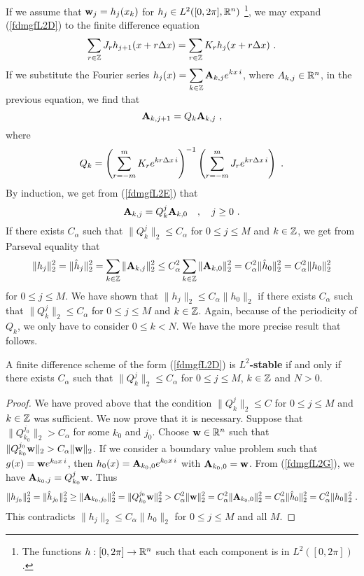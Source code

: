If we assume that $\displaystyle \mathbf{w}_j = h_j(x_k)$ for
$h_j \in L^2([0,2\pi],\mathbb{R}^n)$ \footnote{The functions
$h:[0,2\pi] \to \mathbb{R}^n$ such that each component is in $L^2([0,2\pi])$.},
we may expand (\ref{fdmgfL2D}) to the finite difference equation
\begin{equation}\label{fdmgfL2F}
\sum_{r\in \mathbb{Z}} J_r h_{j+1}(x+r\Delta{x}) =
\sum_{r\in \mathbb{Z}} K_r h_j(x+r\Delta{x}) \ .
\end{equation}
If we substitute the Fourier series
$\displaystyle h_j(x) = \sum_{k\in \mathbb{Z}} \mathbf{A}_{k,j} e^{k x\, i}$,
where $A_{k,j} \in \mathbb{R}^n$, in the previous equation, we find that
\begin{equation}\label{fdmgfL2E}
  \mathbf{A}_{k,j+1} = Q_k \mathbf{A}_{k,j} \ ,
\end{equation}
where
\[
  Q_k = \left( \sum_{r=-m}^m K_r e^{k r \Delta{x}\, i} \right)^{-1}
  \left( \sum_{r=-m}^m J_r  e^{k r \Delta{x}\, i} \right) \ .
\]
By induction, we get from (\ref{fdmgfL2E}) that
\begin{equation}\label{fdmgfL2G}
\mathbf{A}_{k,j} = Q_k^j \mathbf{A}_{k,0} \quad , \quad j \geq 0 \ .
\end{equation}
If there exists $C_\alpha$ such that $\|Q_k^j\|_2 \leq C_\alpha$ for
$0\leq j \leq M$ and $k \in \mathbb{Z}$,  we get from Parseval equality that
\[
  \|h_j\|_2^2 = \|\hat{h}_j \|_2^2
  = \sum_{k\in \mathbb{Z}} \|\mathbf{A}_{k,j}\|_2^2
\leq C_\alpha^2 \sum_{k\in \mathbb{Z}} \|\mathbf{A}_{k,0}\|_2^2
= C_\alpha^2 \|\hat{h}_0 \|_2^2 = C_\alpha^2\|h_0\|_2^2
\]
for $0 \leq j \leq M$.  We have shown that $\|h_j\|_2 \leq C_\alpha \|h_0\|_2$
if there exists $C_\alpha$ such that $\|Q_k^j\|_2 \leq C_\alpha$ for
$0\leq j \leq M$ and $k \in \mathbb{Z}$.   Again, because of the periodicity
of $Q_k$, we only have to consider $0 \leq k <N$.  We have the more
precise result that follows.

\begin{prop}
A finite difference scheme of the form (\ref{fdmgfL2D}) is
{\bfseries $L^2$-stable} if and only if there exists $C_\alpha$ such that
$\|Q_k^j\|_2 \leq C_\alpha$ for $0\leq j \leq M$, $k \in \mathbb{Z}$ and $N>0$.
\label{QkjCstable}
\end{prop}

\begin{proof}
We have proved above that the condition $\|Q_k^j\|_2 \leq C$ for
$0\leq j \leq M$ and $k \in \mathbb{Z}$ was sufficient.   We now prove that
it is necessary.  Suppose that $\|Q_{k_0}^{j_0}\|_2 > C_\alpha$ for
some $k_0$ and $j_0$.  Choose $\mathbf{w} \in \mathbb{R}^n$ such that
$\|Q_{k_0}^{j_0}\mathbf{w}\|_2 > C_\alpha \|\mathbf{w}\|_2$.
If we consider a boundary value problem
such that $g(x) = \mathbf{w} e^{k_0 x\, i}$, then
$\displaystyle h_0(x) = \mathbf{A}_{k_0,0} e^{k_0 x\, i}$ with
$\mathbf{A}_{k_0,0} = \mathbf{w}$.  From (\ref{fdmgfL2G}), we have
$\mathbf{A}_{k_0,j} = Q_{k_0}^j\mathbf{w}$.   Thus
\[
\|h_{j_0}\|_2^2 = \|\hat{h}_{j_0}\|_2^2 \geq \|\mathbf{A}_{k_0,j_0}\|_2^2
= \| Q_{k_0}^{j_0} \mathbf{w} \|_2^2
> C_\alpha^2 \|\mathbf{w}\|_2^2 = C_\alpha^2 \|\mathbf{A}_{k_0,0}\|_2^2
= C_\alpha^2 \|\hat{h}_0\|_2^2 = C_\alpha^2 \|h_0\|_2^2 \ .
\]
This contradicts $\|h_j\|_2 \leq C_\alpha \|h_0\|_2$ for
$0 \leq j \leq M$ and all $M$.
\end{proof}

